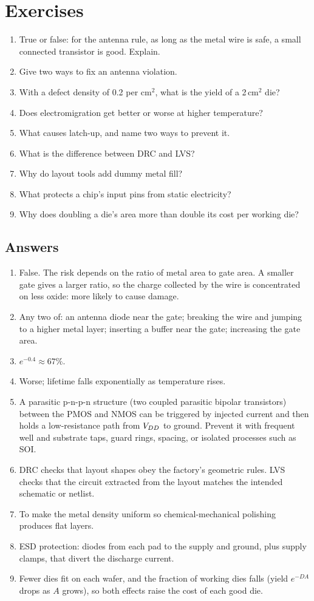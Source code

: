 \section{Exercises}

\begin{enumerate}
  \item True or false: for the antenna rule, as long as the metal wire is safe, a small connected transistor is good. Explain.
  \item Give two ways to fix an antenna violation.
  \item With a defect density of 0.2 per cm$^2$, what is the yield of a 2\,cm$^2$ die?
  \item Does electromigration get better or worse at higher temperature?
  \item What causes latch-up, and name two ways to prevent it.
  \item What is the difference between DRC and LVS?
  \item Why do layout tools add dummy metal fill?
  \item What protects a chip's input pins from static electricity?
  \item Why does doubling a die's area more than double its cost per working die?
\end{enumerate}

\subsection*{Answers}
\begin{enumerate}
  \item False. The risk depends on the ratio of metal area to gate area. A smaller gate gives a larger ratio, so the charge collected by the wire is concentrated on less oxide: more likely to cause damage.
  \item Any two of: an antenna diode near the gate; breaking the wire and jumping to a higher metal layer; inserting a buffer near the gate; increasing the gate area.
  \item $e^{-0.4} \approx 67\%$.
  \item Worse; lifetime falls exponentially as temperature rises.
  \item A parasitic p-n-p-n structure (two coupled parasitic bipolar transistors) between the PMOS and NMOS can be triggered by injected current and then holds a low-resistance path from $V_{DD}$ to ground. Prevent it with frequent well and substrate taps, guard rings, spacing, or isolated processes such as SOI.
  \item DRC checks that layout shapes obey the factory's geometric rules. LVS checks that the circuit extracted from the layout matches the intended schematic or netlist.
  \item To make the metal density uniform so chemical-mechanical polishing produces flat layers.
  \item ESD protection: diodes from each pad to the supply and ground, plus supply clamps, that divert the discharge current.
  \item Fewer dies fit on each wafer, and the fraction of working dies falls (yield $e^{-DA}$ drops as $A$ grows), so both effects raise the cost of each good die.
\end{enumerate}
